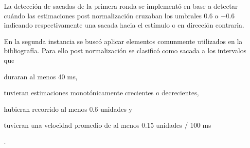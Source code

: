   La detección de sacadas de la primera ronda se implementó en base a detectar
  cuándo las estimaciones post normalización cruzaban los umbrales $0.6$ o
  $-0.6$ indicando respectivamente una sacada hacia el estímulo o en dirección
  contraria.

  En la segunda instancia se buscó aplicar elementos comunmente utilizados en
  la bibliografía.
  Para ello post normalización se clasificó como sacada a los intervalos que
  \begin{enumerate*}
    \item duraran al menos 40 ms,
    \item tuvieran estimaciones monotónicamente crecientes o decrecientes,
    \item hubieran recorrido al menos 0.6 unidades y
    \item tuvieran una velocidad promedio de al menos 0.15 unidades / 100 ms
  \end{enumerate*}.
  \label{section:saccades-detection}
